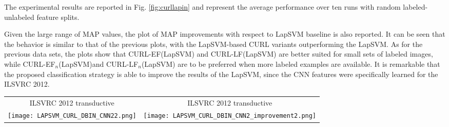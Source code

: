 \documentclass[journal,11pt]{IEEEtran}
\newcommand{\coso}{strategy}
\newcommand{\curllaplf}{CURL-LF(LapSVM)}
\newcommand{\curllaplfn}{CURL-LF$_n$(LapSVM)}
\newcommand{\curllapef}{CURL-EF(LapSVM)}
\newcommand{\curllapefn}{CURL-EF$_n$(LapSVM)}
\begin{document}
The experimental results are reported in Fig. \ref{fig:curllapin} and represent the average performance over ten runs with random labeled-unlabeled feature splits. 

Given the large range of MAP values, the plot of MAP improvements with respect to LapSVM baseline is also reported. It can be seen that the behavior is similar to that of the previous plots, with the LapSVM-based CURL variants outperforming the LapSVM. As for the previous data sets, the plots show that \curllapef{ }and \curllaplf{ }are better suited for small sets of labeled images, while \curllapefn and \curllaplfn{ }are to be preferred when more labeled examples are available. It is remarkable that the proposed classification \coso{ }is able to improve the results of the LapSVM, since the CNN features were specifically learned for the ILSVRC 2012.


\begin{figure*}[!htbp]%
\centering
\begin{tabular}{cc}
\footnotesize{ILSVRC 2012 transductive}  & \footnotesize{ILSVRC 2012 transductive}  \\
\texttt{[image: LAPSVM\_CURL\_DBIN\_CNN22.png]} &
\texttt{[image: LAPSVM\_CURL\_DBIN\_CNN2\_improvement2.png]} \\
\end{tabular}
\caption{Mean Average Precision (MAP) varying the number of labeled images per class, obtained on the ILSVRC 2012 data set: MAP values (left) and MAP improvements over LapSVM baseline (right). Results are obtained using GIST, PHOG, LBP and CNN features.}%
\label{fig:curllapin}%
\end{figure*}



%
%
\end{document}
